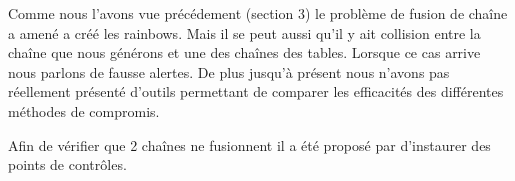 	Comme nous l'avons vue précédement (section 3) le problème de fusion de chaîne a amené a créé les \glspl{rainbow}. Mais il se peut aussi qu'il y ait collision entre la chaîne que nous générons et une des chaînes des tables. Lorsque ce cas arrive nous parlons de fausse alertes.
	De plus jusqu'à présent nous n'avons pas réellement présenté d'outils permettant de comparer les efficacités des différentes méthodes de compromis.

	Afin de vérifier que 2 chaînes ne fusionnent il a été proposé par \cite{checkpoints} d'instaurer des points de contrôles.

	



\endinput{}
